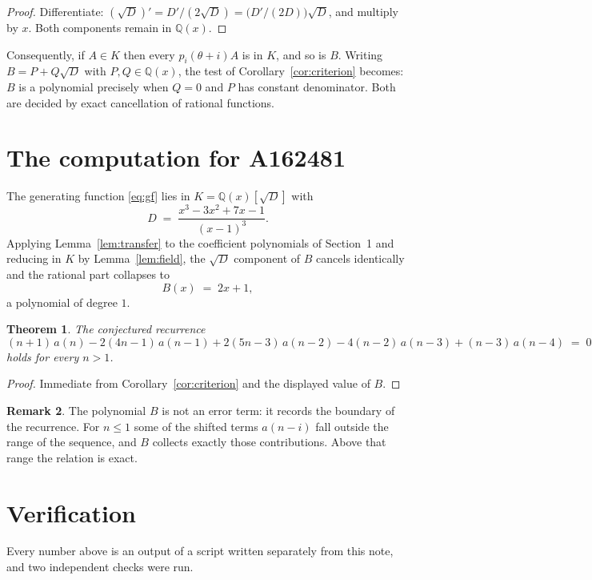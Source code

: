 \documentclass[11pt,a4paper]{article}
\theoremstyle{plain}
\newtheorem{theorem}{Theorem}
\theoremstyle{definition}
\newtheorem{remark}[theorem]{Remark}
\begin{document}
\begin{proof}
Differentiate: $(\sqrt{D})'=D'/(2\sqrt{D})=\bigl(D'/(2D)\bigr)\sqrt{D}$, and multiply by
$x$. Both components remain in $\mathbb{Q}(x)$.
\end{proof}

Consequently, if $A\in K$ then every $p_{i}(\theta+i)A$ is in $K$, and so is $B$. Writing
$B=P+Q\sqrt{D}$ with $P,Q\in\mathbb{Q}(x)$, the test of Corollary~\ref{cor:criterion}
becomes: $B$ is a polynomial precisely when $Q=0$ and $P$ has constant denominator. Both
are decided by exact cancellation of rational functions.

\section{The computation for A162481}

The generating function \eqref{eq:gf} lies in $K=\mathbb{Q}(x)[\sqrt{D}]$ with
\[
D \;=\; \frac{x^{3} - 3 x^{2} + 7 x - 1}{\left(x - 1\right)^{3}} .
\]
Applying Lemma~\ref{lem:transfer} to the coefficient polynomials of Section~1 and reducing
in $K$ by Lemma~\ref{lem:field}, the $\sqrt{D}$ component of $B$ cancels identically and
the rational part collapses to
\[
B(x)\;=\;2 x + 1 ,
\]
a polynomial of degree $1$.

\begin{theorem}
The conjectured recurrence
\[
(n + 1)\,a(n) -  2 \left(4 n - 1\right)\,a(n-1) + 2 \left(5 n - 3\right)\,a(n-2) -  4 \left(n - 2\right)\,a(n-3) + (n - 3)\,a(n-4) \;=\;0
\]
holds for every $n>1$.
\end{theorem}

\begin{proof}
Immediate from Corollary~\ref{cor:criterion} and the displayed value of $B$.
\end{proof}

\begin{remark}
The polynomial $B$ is not an error term: it records the boundary of the recurrence. For
$n\le1$ some of the shifted terms $a(n-i)$ fall outside the range of the sequence,
and $B$ collects exactly those contributions. Above that range the relation is exact.
\end{remark}

\section{Verification}

Every number above is an output of a script written separately from this note, and two
independent checks were run.
\end{document}
